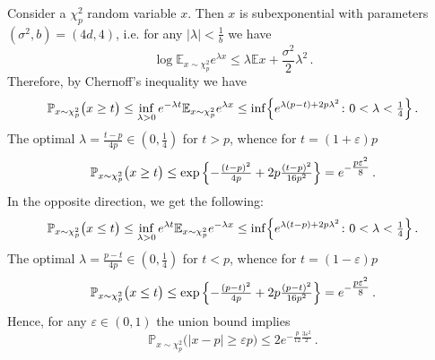 \documentclass[a4paper,10pt]{article}
\begin{document}
Consider a $\chi^2_p$ random variable $x$. Then $x$ is subexponential with parameters
$(\sigma^2, b) = (4d, 4)$, i.e. for any $\lvert\lambda\rvert < \tfrac1b$ we have
$$
  \log \mathbb{E}_{x\sim \chi^2_p} e^{\lambda x}
    \leq \lambda \mathbb{E} x + \frac{\sigma^2}2 \lambda^2
    \,. $$
Therefore, by Chernoff's inequality we have
\begin{equation*}
  \mathbb{P}_{x \sim \chi^2_p}\bigl( x \geq t \bigr)
    \leq \inf_{\lambda > 0} e^{- \lambda t} \mathbb{E}_{x \sim \chi^2_p} e^{\lambda x}
    \leq \inf\Bigl\{
      e^{\lambda (p - t) + 2p \lambda^2}
      \colon 0 < \lambda < \tfrac14
    \Bigr\}
    \,.
\end{equation*}
The optimal $\lambda = \tfrac{t - p}{4p} \in (0, \tfrac14)$ for $t > p$, whence
for $t = (1 + \varepsilon) p$
\begin{equation*}
  \mathbb{P}_{x \sim \chi^2_p}\bigl( x \geq t \bigr)
    \leq \exp{\Bigl\{
        -\tfrac{(t - p)^2}{4p} + 2p \tfrac{(t - p)^2}{16 p^2}
      \Bigr\}}
    = e^{-\tfrac{p \varepsilon^2}8}
    \,.
\end{equation*}
In the opposite direction, we get the following:
\begin{equation*}
  \mathbb{P}_{x \sim \chi^2_p}\bigl( x \leq t \bigr)
    \leq \inf_{\lambda > 0} e^{\lambda t} \mathbb{E}_{x \sim \chi^2_p} e^{- \lambda x}
    \leq \inf\Bigl\{
      e^{\lambda (t - p) + 2p \lambda^2}
      \colon 0 < \lambda < \tfrac14
    \Bigr\}
    \,.
\end{equation*}
The optimal $\lambda = \tfrac{p - t}{4p} \in (0, \tfrac14)$ for $t < p$, whence
for $t = (1 - \varepsilon) p$
\begin{equation*}
  \mathbb{P}_{x \sim \chi^2_p}\bigl( x \leq t \bigr)
    \leq \exp{\Bigl\{
        -\tfrac{(p - t)^2}{4p} + 2p \tfrac{(p - t)^2}{16 p^2}
      \Bigr\}}
    = e^{-\tfrac{p \varepsilon^2}8}
    \,.
\end{equation*}
Hence, for any $\varepsilon \in (0, 1)$ the union bound implies
\begin{equation*}
  \mathbb{P}_{x \sim \chi^2_p}\bigl(
      \lvert x - p\rvert \geq \varepsilon p
    \bigr)
    \leq 2 e^{-\tfrac{p}{12} \tfrac{3 \varepsilon^2}2}
    \,.
\end{equation*}
\end{document}
